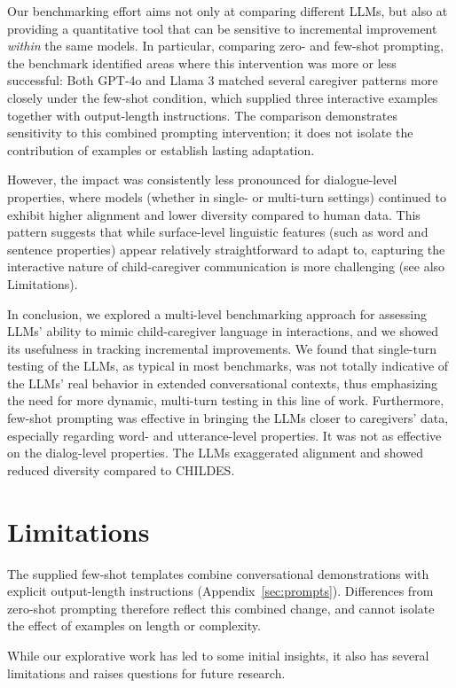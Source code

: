 Our benchmarking effort aims not only at comparing different LLMs, but also at providing a quantitative tool that can be sensitive to incremental improvement \textit{within} the same models. In particular, comparing zero- and few-shot prompting, the benchmark identified areas where this intervention was more or less successful: Both GPT-4o and Llama 3 matched several caregiver patterns more closely under the few-shot condition, which supplied three interactive examples together with output-length instructions. The comparison demonstrates sensitivity to this combined prompting intervention; it does not isolate the contribution of examples or establish lasting adaptation. 

However, the impact was consistently less pronounced for dialogue-level properties, where models (whether in single- or multi-turn settings) continued to exhibit higher alignment and lower diversity compared to human data. This pattern suggests that while surface-level linguistic features (such as word and sentence properties) appear relatively straightforward to adapt to, capturing the interactive nature of child-caregiver communication is more challenging (see also Limitations).

In conclusion, we explored a multi-level benchmarking approach for assessing LLMs' ability to mimic child-caregiver language in interactions, and we showed its usefulness in tracking incremental improvements. We found that single-turn testing of the LLMs, as typical in most benchmarks, was not totally indicative of the LLMs' real behavior in extended conversational contexts, thus emphasizing the need for more dynamic, multi-turn testing in this line of work. Furthermore, few-shot prompting was effective in bringing the LLMs closer to caregivers' data, especially regarding word- and utterance-level properties. It was not as effective on the dialog-level properties. The LLMs exaggerated alignment and showed reduced diversity compared to CHILDES. 


\section{Limitations}
The supplied few-shot templates combine conversational demonstrations with explicit output-length instructions (Appendix~\ref{sec:prompts}). Differences from zero-shot prompting therefore reflect this combined change, and cannot isolate the effect of examples on length or complexity.


While our explorative work has led to some initial insights, it also has several limitations and raises questions for future research.

